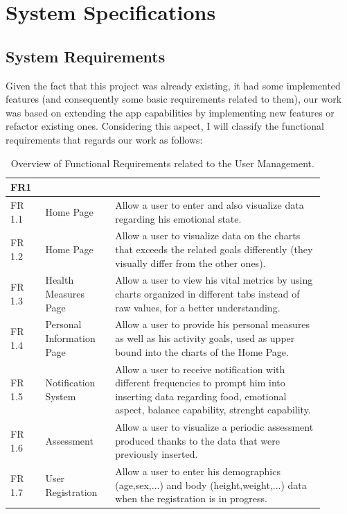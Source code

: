 \newpage
\section{System Specifications}
\subsection{System Requirements}
Given the fact that this project was already existing, it had some implemented features (and consequently some basic requirements related to them), our work was based on extending the app capabilities by implementing new features or refactor existing ones. \newline Considering this aspect, I will classify the functional requirements that regards our work as follows:
% 
%     
\begin{table}[h!]
    \setstretch{\myspacing}
    \centering
    \begin{tabular}{|>{\raggedright\arraybackslash}p{0.1\linewidth}|>{\raggedright\arraybackslash}p{0.2\linewidth}|>{\raggedright\arraybackslash}p{0.6\linewidth}|}
        \hline
        \textbf{FR1} & \multicolumn{2}{>{\centering\arraybackslash}p{0.7\linewidth}|}{\textbf{User Management}} \\
        \hline
        FR 1.1 & Home Page & Allow a user to enter and also visualize data regarding his emotional state. \\
        \hline
        FR 1.2 & Home Page & Allow a user to visualize data on the charts that exceeds the related goals differently (they visually differ from the other ones). \\
        \hline
        FR 1.3 & Health Measures Page & Allow a user to view his vital metrics by using charts organized in different tabs instead of raw values, for a better understanding. \\
        \hline
        FR 1.4 & Personal Information Page & Allow a user to provide his personal measures as well as his activity goals, used as upper bound into the charts of the Home Page. \\
        \hline
        FR 1.5 & Notification System & Allow a user to receive notification with different frequencies to prompt him into inserting data regarding food, emotional aspect, balance capability, strenght capability. \\
        \hline
        FR 1.6 & Assessment & Allow a user to visualize a periodic assessment produced thanks to the data that were previously inserted. \\
        \hline
        FR 1.7 & User Registration & Allow a user to enter his demographics (age,sex,...) and body (height,weight,...) data when the registration is in progress. \\
        \hline
    \end{tabular}
    \caption{Overview of Functional Requirements related to the User Management.}
\end{table}

